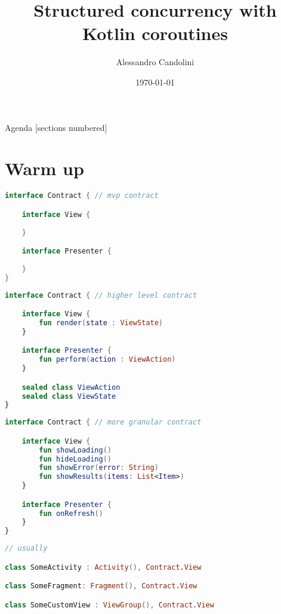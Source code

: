 \documentclass[10pt]{beamer}
\title{Structured concurrency with Kotlin coroutines}
\date{\today}
\author[A. Candolini]{Alessandro Candolini}
\begin{document}
\maketitle

\begin{frame}{Agenda}
  [sections numbered]
  \tableofcontents[hideallsubsections]
\end{frame}

\section{Warm up}


\begin{frame}[fragile]
\begin{lstlisting}[language=Kotlin, basicstyle=\ttfamily]
interface Contract { // mvp contract

    interface View {
    
    }

    interface Presenter {
   
    }
}
\end{lstlisting}
\end{frame}
\begin{frame}[fragile]
\begin{lstlisting}[language=Kotlin, basicstyle=\ttfamily]
interface Contract { // higher level contract 

    interface View {
        fun render(state : ViewState)
    }

    interface Presenter {
        fun perform(action : ViewAction)
    }

    sealed class ViewAction
    sealed class ViewState
}
\end{lstlisting}
\end{frame}

\begin{frame}[fragile]
\begin{lstlisting}[language=Kotlin, basicstyle=\ttfamily]
interface Contract { // more granular contract 

    interface View {
        fun showLoading()
        fun hideLoading()
        fun showError(error: String)
        fun showResults(items: List<Item>)
    }

    interface Presenter {
        fun onRefresh()
    }
}
\end{lstlisting}
\end{frame}


\begin{frame}[fragile]
\begin{lstlisting}[language=Kotlin, basicstyle=\ttfamily]
// usually  

class SomeActivity : Activity(), Contract.View 

class SomeFragment: Fragment(), Contract.View 

class SomeCustomView : ViewGroup(), Contract.View 

\end{lstlisting}
\end{frame}
\end{document}
